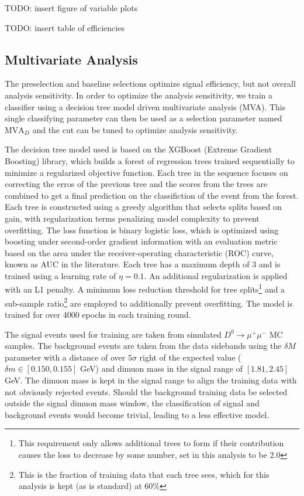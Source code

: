 TODO: insert figure of variable plots

TODO: insert table of efficiencies


\subsection{Multivariate Analysis}

The preselection and baseline selections optimize signal efficiency, but not overall analysis sensitivity. In order to optimize the analysis sensitivity, we train a classifier using a decision tree model driven multivariate analysis (MVA). This single classifying parameter can then be used as a selection parameter named $\text{MVA}_D$ and the cut can be tuned to optimize analysis sensitivity.

The decision tree model used is based on the XGBoost (Extreme Gradient Boosting) library, which builds a forest of regression trees trained sequentially to minimize a regularized objective function. Each tree in the sequence focuses on correcting the erros of the previous tree and the scores from the trees are combined to get a final prediction on the classifiction of the event from the forest. Each tree is constructed using a greedy algorithm that selects splits based on gain, with regularization terms penalizing model complexity to prevent overfitting. The loss function is binary logistic loss, which is optimized using boosting under second-order gradient information with an evaluation metric based on the area under the receiver-operating characteristic (ROC) curve, known as AUC in the literature. Each tree has a maximum depth of 3 and is trained using a learning rate of $\eta = 0.1$. An additional regularization is applied with an L1 penalty. A minimum loss reduction threshold for tree splits\footnote{This requirement only allows additional trees to form if their contribution causes the loss to decrease by some number, set in this analysis to be $2.0$} and a sub-sample ratio\footnote{This is the fraction of training data that each tree sees, which for this analysis is kept (as is standard) at $60\%$} are employed to additionally prevent overfitting. The model is trained for over 4000 epochs in each training round.

The signal events used for training are taken from simulated $D^0 \to \mu^+ \mu^-$ MC samples. The background events are taken from the data sidebands using the $\delta M$ parameter with a distance of over $5\sigma$ right of the expected value ($\delta m \in [0.150, 0.155]$ GeV) and dimuon mass in the signal range of $[1.81, 2.45]$ GeV. The dimuon mass is kept in the signal range to align the training data with not obviously rejected events. Should the background training data be selected outside the signal dimuon mass window, the classification of signal and background events would become trivial, leading to a less effective model.

